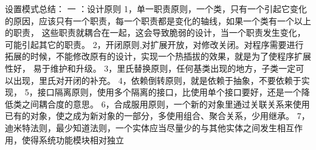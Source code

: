  设置模式总结：
 一 ：设计原则
 1，单一职责原则，一个类，只有一个引起它变化的原因，应该只有一个职责，每一个职责都是变化的轴线，如果一个类有一个以上的职责，
 这些职责就耦合在一起，这会导致脆弱的设计，当一个职责发生变化，可能引起其它的职责。
 2，开闭原则,对扩展开放，对修改关闭。对程序需要进行拓展的时候，不能修改原有的设计，实现一个热插拔的效果，就是为了使程序扩展性好，
 易于维护和升级。
 3，里氏替换原则，任何基类出现的地方，子类一定可以出现，里氏对开闭的补充。
 4，依赖倒转原则，就是依赖于抽象，不要依赖于实现，
 5，接口隔离原则，使用多个隔离的接口，比使用单个接口要好，还是一个降低类之间耦合度的意思。
 6，合成服用原则，一个新的对象里通过关联关系来使用已有的对象，使之成为新对象的一部分，多使用组合、聚合关系，少用继承。
 7，迪米特法则，最少知道法则，一个实体应当尽量少的与其他实体之间发生相互作用，使得系统功能模块相对独立
